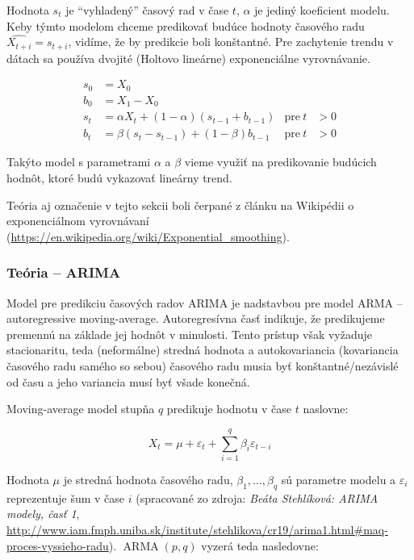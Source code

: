 \documentclass[report.tex]{subfiles}
\begin{document}
Hodnota $s_t$ je \enquote{vyhladený} časový rad v čase $t$, $\alpha$ je jediný koeficient modelu. Keby týmto modelom chceme predikovať budúce hodnoty časového radu $\widehat{X_{t+i}} = s_{t+i}$, vidíme, že by predikcie boli konštantné. Pre zachytenie trendu v dátach sa používa dvojité (Holtovo lineárne) exponenciálne vyrovnávanie.

\begin{align*}
	s_0 &= X_0 \\
	b_0 &= X_1 - X_0 \\
	s_t &= \alpha X_t + (1-\alpha) (s_{t-1} + b_{t-1}) & \text{pre}~t&>0 \\
	b_t &= \beta (s_t - s_{t-1}) + (1-\beta)b_{t-1} & \text{pre}~t&>0 
\end{align*}

Takýto model s parametrami $\alpha$ a $\beta$ vieme využiť na predikovanie budúcich hodnôt, ktoré budú vykazovať lineárny trend.

Teória aj označenie v tejto sekcii boli čerpané z článku na Wikipédii o exponenciálnom vyrovnávaní (\href{https://en.wikipedia.org/wiki/Exponential_smoothing#}{https://en.wikipedia.org/wiki/Exponential\_smoothing}).

\subsubsection{Teória -- ARIMA} 

Model pre predikciu časových radov ARIMA je nadstavbou pre model ARMA -- autoregressive moving-average. Autoregresívna časť indikuje, že predikujeme premennú na základe jej hodnôt v minulosti. Tento prístup však vyžaduje stacionaritu, teda (neformálne) stredná hodnota a autokovariancia (kovariancia časového radu samého so sebou) časového radu musia byť konštantné/nezávislé od času a jeho variancia musí byť všade konečná. 

Moving-average model stupňa $q$ predikuje hodnotu v čase $t$ naslovne:

\begin{equation*}
	X_t = \mu + \varepsilon_t + \sum_{i=1}^{q}\beta_i\varepsilon_{t-i}
\end{equation*}

Hodnota $\mu$ je stredná hodnota časového radu, $\beta_1,\dots, \beta_q$ sú parametre modelu a $\varepsilon_i$ reprezentuje šum v čase $i$ (spracované zo zdroja: \textit{Beáta Stehlíková: ARIMA modely, časť 1}, \href{http://www.iam.fmph.uniba.sk/institute/stehlikova/cr19/arima1.html#maq-proces-vyssieho-radu}{http://www.iam.fmph.uniba.sk/institute/stehlikova/cr19/arima1.html\#maq-proces-vyssieho-radu}). $\operatorname{ARMA}(p, q)$ vyzerá teda nasledovne:
\end{document}
